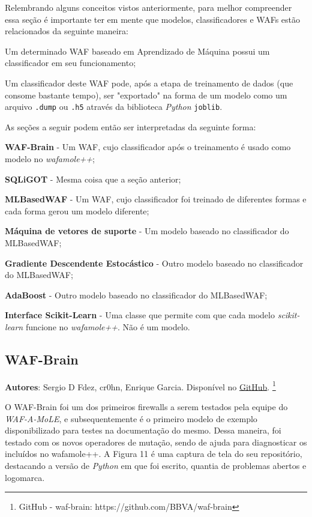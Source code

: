 Relembrando alguns conceitos vistos anteriormente, para melhor compreender essa seção é importante ter em mente que modelos, classificadores e WAFs estão relacionados da seguinte maneira: 

\begin{alineas}
\item Um determinado WAF baseado em Aprendizado de Máquina possui um classificador em seu funcionamento;
\item Um classificador deste WAF pode, após a etapa de treinamento de dados (que consome bastante tempo), ser "exportado" na forma de um modelo como um arquivo \verb+.dump+ ou \verb+.h5+ através da biblioteca \textit{Python} \verb+joblib+.
\end{alineas}

As seções a seguir podem então ser interpretadas da seguinte forma:
\begin{alineas}
\item \textbf{WAF-Brain} - Um WAF, cujo classificador após o treinamento é usado como modelo no \textit{wafamole++};
\item \textbf{SQLiGOT} - Mesma coisa que a seção anterior;
\item \textbf{MLBasedWAF} - Um WAF, cujo classificador foi treinado de diferentes formas e cada forma gerou um modelo diferente;
\item \textbf{Máquina de vetores de suporte} - Um modelo baseado no classificador do MLBasedWAF;
\item \textbf{Gradiente Descendente Estocástico} - Outro modelo baseado no classificador do MLBasedWAF;
\item \textbf{AdaBoost} - Outro modelo baseado no classificador do MLBasedWAF;
\item \textbf{Interface Scikit-Learn} - Uma classe que permite com que cada modelo \textit{scikit-learn} funcione no \textit{wafamole++}. Não é um modelo.
\end{alineas}
\subsection{WAF-Brain}

\textbf{Autores}: Sergio D Fdez, cr0hn, Enrique Garcia. Disponível no \href{https://github.com/BBVA/waf-brain}{GitHub}. \footnote{GitHub - waf-brain: https://github.com/BBVA/waf-brain}

O WAF-Brain \cite{waf_brain} foi um dos primeiros firewalls a serem testados pela equipe do \textit{WAF-A-MoLE}, e subsequentemente é o primeiro modelo de exemplo disponibilizado para testes na documentação do mesmo. Dessa maneira, foi testado com os novos operadores de mutação, sendo de ajuda para diagnosticar os incluídos no wafamole++. A Figura 11 é uma captura de tela do seu repositório, destacando a versão de \textit{Python} em que foi escrito, quantia de problemas abertos e logomarca.

